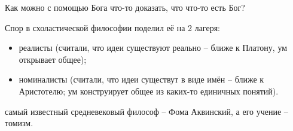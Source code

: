 \documentclass[a4paper, 12pt]{book} %
\begin{document}
Как можно с помощью Бога что-то доказать, что что-то есть Бог?

Спор в схоластической философии поделил её на 2 лагеря:
\begin{itemize}
\item реалисты (считали, что идеи существуют реально -- ближе к Платону, ум открывает общее); 
\item номиналисты (считали, что идеи существут в виде имён -- ближе к Аристотелю; ум конструирует общее из каких-то единичных понятий).
\end{itemize}

самый известный средневековый философ -- Фома Аквинский, а его учение -- томизм.

\tableofcontents 
\end{document}
